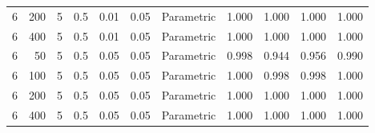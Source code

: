 \begin{table}
{{\begin{tabular}{rrrrrrlllll}
\hspace{1em}6 & 200 & 5 & 0.5 & 0.01 & 0.05 & Parametric & 1.000 & 1.000 & 1.000 & 1.000\\
\hspace{1em}6 & 400 & 5 & 0.5 & 0.01 & 0.05 & Parametric & 1.000 & 1.000 & 1.000 & 1.000\\
\hspace{1em}6 & 50 & 5 & 0.5 & 0.05 & 0.05 & Parametric & 0.998 & 0.944 & 0.956 & 0.990\\
\hspace{1em}6 & 100 & 5 & 0.5 & 0.05 & 0.05 & Parametric & 1.000 & 0.998 & 0.998 & 1.000\\
\hspace{1em}6 & 200 & 5 & 0.5 & 0.05 & 0.05 & Parametric & 1.000 & 1.000 & 1.000 & 1.000\\
\hspace{1em}6 & 400 & 5 & 0.5 & 0.05 & 0.05 & Parametric & 1.000 & 1.000 & 1.000 & 1.000\\
\bottomrule
\end{tabular}
}}
 \end{table}
